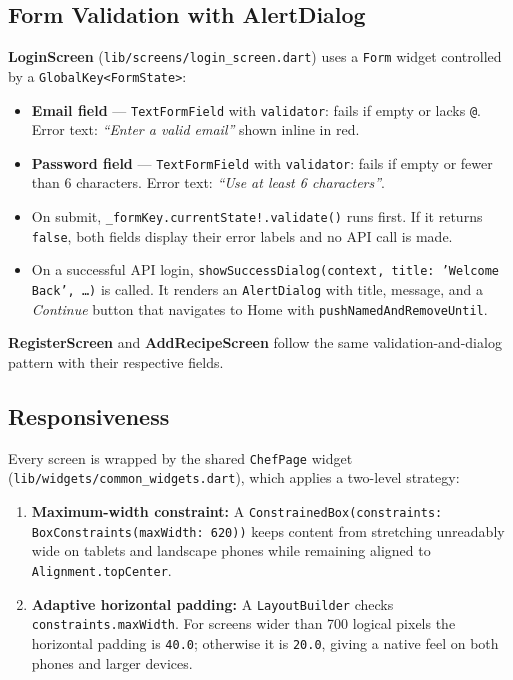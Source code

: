 \documentclass[11pt,a4paper]{article}
\begin{document}
\subsection{Form Validation with AlertDialog}

\textbf{LoginScreen} (\texttt{lib/screens/login\_screen.dart}) uses a \texttt{Form} widget controlled by a \texttt{GlobalKey<FormState>}:

\begin{itemize}
  \item \textbf{Email field} — \texttt{TextFormField} with \texttt{validator}: fails if empty or lacks \texttt{@}. Error text: \emph{``Enter a valid email''} shown inline in red.
  \item \textbf{Password field} — \texttt{TextFormField} with \texttt{validator}: fails if empty or fewer than 6 characters. Error text: \emph{``Use at least 6 characters''}.
  \item On submit, \texttt{\_formKey.currentState!.validate()} runs first. If it returns \texttt{false}, both fields display their error labels and no API call is made.
  \item On a successful API login, \texttt{showSuccessDialog(context, title: 'Welcome Back', \ldots)} is called. It renders an \texttt{AlertDialog} with title, message, and a \emph{Continue} button that navigates to Home with \texttt{pushNamedAndRemoveUntil}.
\end{itemize}

\textbf{RegisterScreen} and \textbf{AddRecipeScreen} follow the same validation-and-dialog pattern with their respective fields.

\subsection{Responsiveness}

Every screen is wrapped by the shared \texttt{ChefPage} widget (\texttt{lib/widgets/common\_widgets.dart}), which applies a two-level strategy:

\begin{enumerate}
  \item \textbf{Maximum-width constraint:} A \texttt{ConstrainedBox(constraints: BoxConstraints(maxWidth: 620))} keeps content from stretching unreadably wide on tablets and landscape phones while remaining aligned to \texttt{Alignment.topCenter}.
  \item \textbf{Adaptive horizontal padding:} A \texttt{LayoutBuilder} checks \texttt{constraints.maxWidth}. For screens wider than 700 logical pixels the horizontal padding is \texttt{40.0}; otherwise it is \texttt{20.0}, giving a native feel on both phones and larger devices.
\end{enumerate}
\end{document}
